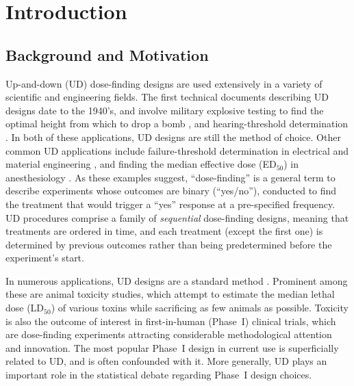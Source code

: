 

\doublespacing




\chapter{Introduction}\label{sec:intro}
\section{Background and Motivation}

Up-and-down (UD) dose-finding designs are used extensively in a variety of scientific and engineering fields. The first technical documents describing UD designs date to the 1940's, and involve military explosive testing to find the optimal height from which to drop a bomb  \citep{Ande:McCa:Tuke:Stai:1946,Dixo:Mood:Amet:1948}, and hearing-threshold determination \citep{vonB:anew:1947}. In both of these applications, UD designs are still the method of choice. Other common UD applications include failure-threshold determination in electrical and material engineering \citep{Lago:Sons:Comp:2004}, and finding the median effective dose (ED$_{50}$) in anesthesiology \citep{Pace:styl:tutor:2007}. As these examples suggest, ``dose-finding'' is a general term to describe experiments whose outcomes are binary (``yes/no''), conducted to find the treatment that would trigger a ``yes'' response at a pre-specified frequency. UD procedures comprise a family of \emph{sequential} dose-finding designs, meaning that treatments are ordered in time, and each treatment (except the first one) is determined by previous outcomes rather than being predetermined before the experiment's start.

In numerous applications, UD designs are a standard method \citep[e.g.,][]{JSME81, ASTM:Stan:1991,OECD:Revi:1998,NIEH:NIH:2001}. Prominent among these are animal toxicity studies, which attempt to estimate the median lethal dose (LD$_{50}$) of various toxins while sacrificing as few animals as possible. Toxicity is also the outcome of interest in first-in-human (Phase~I) clinical trials, which are dose-finding experiments attracting considerable methodological attention and innovation. The most popular Phase~I design in current use is superficially related to UD, and is often confounded with it. More generally, UD plays an important role in the statistical debate regarding Phase~I design choices.

